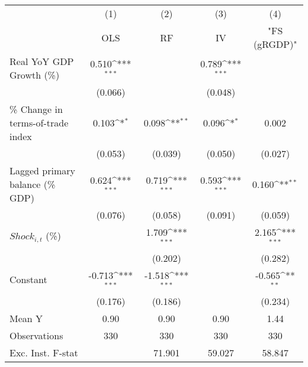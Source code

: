{
\def\sym#1{\ifmmode^{#1}\else\(^{#1}\)\fi}
\begin{tabular}{l*{4}{c}}
\toprule
                    &\multicolumn{1}{c}{(1)}&\multicolumn{1}{c}{(2)}&\multicolumn{1}{c}{(3)}&\multicolumn{1}{c}{(4)}\\
                    &\multicolumn{1}{c}{OLS}&\multicolumn{1}{c}{RF}&\multicolumn{1}{c}{IV}&\multicolumn{1}{c}{ "FS (gRGDP)" }\\
\midrule
Real YoY GDP Growth (\%)&       0.510\sym{***}&                     &       0.789\sym{***}&                     \\
                    &     (0.066)         &                     &     (0.048)         &                     \\
\addlinespace
\% Change in terms-of-trade index&       0.103\sym{*}  &       0.098\sym{**} &       0.096\sym{*}  &       0.002         \\
                    &     (0.053)         &     (0.039)         &     (0.050)         &     (0.027)         \\
\addlinespace
Lagged primary balance (\% GDP)&       0.624\sym{***}&       0.719\sym{***}&       0.593\sym{***}&       0.160\sym{**} \\
                    &     (0.076)         &     (0.058)         &     (0.091)         &     (0.059)         \\
\addlinespace
$ Shock_{i,t}$ (\%) &                     &       1.709\sym{***}&                     &       2.165\sym{***}\\
                    &                     &     (0.202)         &                     &     (0.282)         \\
\addlinespace
Constant            &      -0.713\sym{***}&      -1.518\sym{***}&                     &      -0.565\sym{**} \\
                    &     (0.176)         &     (0.186)         &                     &     (0.234)         \\
\midrule
Mean Y              &        0.90         &        0.90         &        0.90         &        1.44         \\
Observations        &         330         &         330         &         330         &         330         \\
Exc. Inst. F-stat   &                     &      71.901         &      59.027         &      58.847         \\
\bottomrule
\end{tabular}
}
